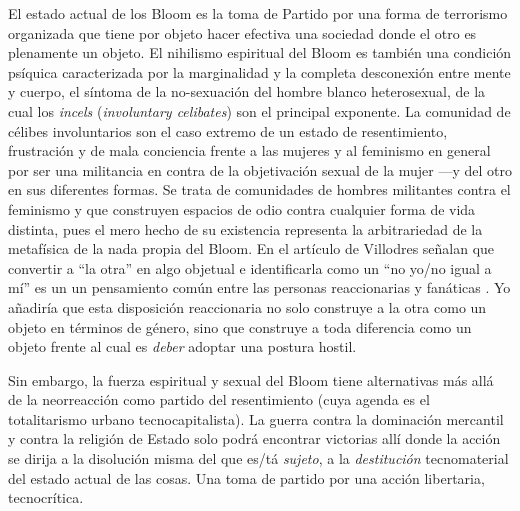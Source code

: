 El estado actual de los Bloom es la toma de Partido por una forma de terrorismo organizada que tiene por objeto hacer efectiva una sociedad donde el otro es plenamente un objeto. El nihilismo espiritual del Bloom es también una condición psíquica caracterizada por la marginalidad y la completa desconexión entre mente y cuerpo, el síntoma de la no-sexuación del hombre blanco heterosexual, de la cual los \emph{incels} (\emph{involuntary celibates}) son el principal exponente. La comunidad de célibes involuntarios son el caso extremo de un estado de resentimiento, frustración y de mala conciencia frente a las mujeres y al feminismo en general por ser una militancia en contra de la objetivación sexual de la mujer ---y del otro en sus diferentes formas. Se trata de comunidades de hombres militantes contra el feminismo y que construyen espacios de odio contra cualquier forma de vida distinta, pues el mero hecho de su existencia representa la arbitrariedad de la metafísica de la nada propia del Bloom. En el artículo de Villodres señalan que convertir a \enquote{la otra} en algo objetual e identificarla como un \enquote{no yo/no igual a mí} es un un pensamiento común entre las personas reaccionarias y fanáticas \autocite{villodresQueSonIncels2018}. Yo añadiría que esta disposición reaccionaria no solo construye a la otra como un objeto en términos de género, sino que construye a toda diferencia como un objeto frente al cual es \emph{deber} adoptar una postura hostil.

Sin embargo, la fuerza espiritual y sexual del Bloom tiene alternativas más allá de la neorreacción como partido del resentimiento (cuya agenda es el totalitarismo urbano tecnocapitalista). La guerra contra la dominación mercantil y contra la religión de Estado solo podrá encontrar victorias allí donde la acción se dirija a la disolución misma del que es/tá \emph{sujeto}, a la \emph{destitución} tecnomaterial del estado actual de las cosas. Una toma de partido por una acción libertaria, tecnocrítica.


